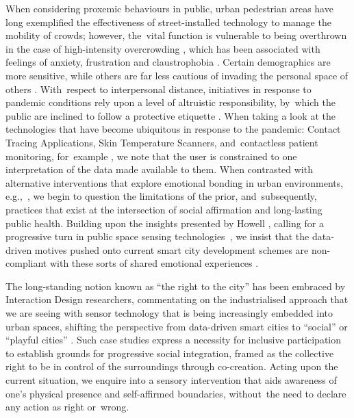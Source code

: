 When considering proxemic behaviours in public, urban pedestrian areas have long exemplified the effectiveness of street-installed technology to manage the mobility of crowds; however, the~vital function is vulnerable to being overthrown in the case of high-intensity overcrowding \citep{gehl_public_2004,machleit_perceived_2000}, which has been associated with feelings of anxiety, frustration and claustrophobia \citep{kendrick_user_2010}. Certain demographics are more sensitive, while others are far less cautious of invading the personal space of others \citep{peimani_where_2016,remland_interpersonal_1995}. With~respect to interpersonal distance, initiatives in response to pandemic conditions rely upon a level of altruistic responsibility, by~which the public are inclined to follow a protective etiquette \citep{honey-roses_impact_2020}. When taking a look at the technologies that have become ubiquitous in response to the pandemic: Contact Tracing Applications, Skin Temperature Scanners, and~contactless patient monitoring, for~example \citep{mehrdad_perspective_2021,taylor_review_2020}, we note that the user is constrained to one interpretation of the data made available to them. When contrasted with alternative interventions that explore emotional bonding in urban environments, e.g.,~\citep{adhitya_london_2018,gatehouse_feral_2016}, we begin to question the limitations of the prior, and~subsequently, practices that exist at the intersection of social affirmation and long-lasting public health. Building upon the insights presented by Howell \cite{howell_life-affirming_2019}, calling for a progressive turn in public space sensing technologies~\cite{howell_life-affirming_2019}, we insist that the data-driven motives pushed onto current smart city development schemes are non-compliant with these sorts of shared emotional experiences \citep{battarbee_pools_2002,lange_owning_2013,bueno_smart_2016}.

The long-standing notion known as
``the right to the city'' has been embraced by Interaction Design researchers, commentating on the industrialised approach that we are seeing with sensor technology that is being increasingly embedded into urban spaces, shifting the perspective from data-driven smart cities to
``social'' or ``playful cities'' \citep{castro_seixas_urban_2021,howell_life-affirming_2019}. Such case studies express a necessity for inclusive participation to establish grounds for progressive social integration, framed as the collective right to be in control of the surroundings through co-creation. Acting upon the current situation, we enquire into a sensory intervention that aids awareness of one's physical presence and self-affirmed boundaries, without~the need to declare any action as right or~wrong.

